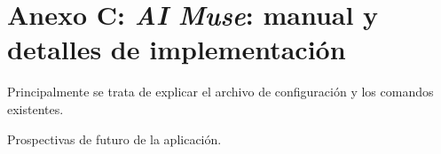\chapter*{Anexo C: \textit{AI Muse}: manual y detalles de implementación}
\label{anexo:aimuse}

Principalmente se trata de explicar el archivo de configuración y los comandos existentes.

Prospectivas de futuro de la aplicación.
